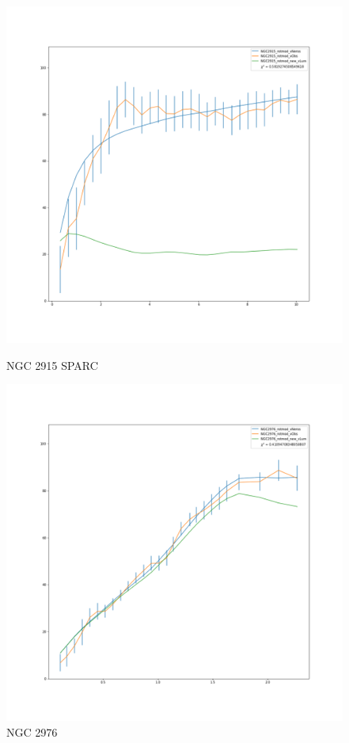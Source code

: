 \documentclass[reprint,%
 amsmath,amssymb,
 aps,
]{revtex4-1}
\begin{document}
 
\begin{figure} 
\centering
\begin{minipage}{0.5\textwidth}
\includegraphics[width=0.95\linewidth]{figures/NGC2915_rotmod_XueSofue.png}
\caption{NGC 2915 SPARC\cite{2016Lelli}}
\label{fig:2915}
\end{minipage}
\begin{minipage}{0.5\textwidth}
\includegraphics[width=0.95\linewidth]{figures/NGC2976_rotmod_XueSofue.png}
\caption{NGC 2976}
\label{fig:2976}
\end{minipage}
\end{figure}
  
\end{document}
